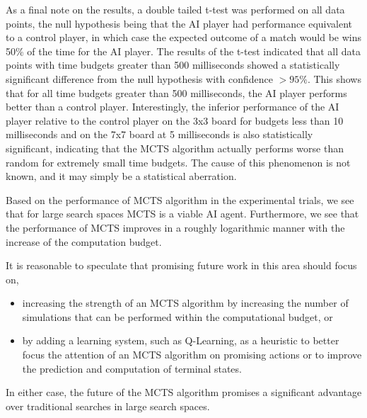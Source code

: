 \documentclass[landscape,final,a0paper,10pt]{baposter}
\begin{document}
\begin{poster}
{
As a final note on the results, a double tailed t-test was performed on all data points, the null hypothesis being that the AI player had performance equivalent to a control player, in which case the expected outcome of a match would be wins 50\% of the time for the AI player.
The results of the t-test indicated that all data points with time budgets greater than 500 milliseconds showed a statistically significant difference from the null hypothesis with confidence \(>95\%\).
This shows that for all time budgets greater than 500 milliseconds, the AI player performs better than a control player.
Interestingly, the inferior performance of the AI player relative to the control player on the 3x3 board for budgets less than 10 milliseconds and on the 7x7 board at 5 milliseconds is also statistically significant, indicating that the MCTS algorithm actually performs worse than random for extremely small time budgets.
The cause of this phenomenon is not known, and it may simply be a statistical aberration.
}

{
Based on the performance of MCTS algorithm in the experimental trials, we see that for large search spaces MCTS is a viable AI agent.
Furthermore, we see that the performance of MCTS improves in a roughly logarithmic manner with the increase of the computation budget.

It is reasonable to speculate that promising future work in this area should focus on,

\begin{itemize}
\item increasing the strength of an MCTS algorithm by increasing the number of simulations that can be performed within the computational budget, or
\item by adding a learning system, such as Q-Learning, as a heuristic to better focus the attention of an MCTS algorithm on promising actions or to improve the prediction and computation of terminal states.
\end{itemize}

In either case, the future of the MCTS algorithm promises a significant advantage over traditional searches in large search spaces.
}


\end{poster}
\end{document}
